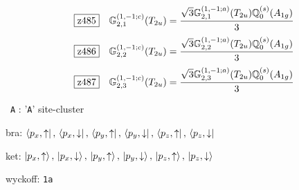 \documentclass[fleqn,10pt,landscape]{jsarticle}
\begin{document}
\begin{dmath*}
\hspace*{3mm}\fbox{z485}\quad \mathbb{G}_{2,1}^{(1,-1;c)}(T_{2u})=\frac{\sqrt{3} \mathbb{G}_{2,1}^{(1,-1;a)}(T_{2u}) \mathbb{Q}_{0}^{(s)}(A_{1g})}{3}
\end{dmath*}
\begin{dmath*}
\hspace*{3mm}\fbox{z486}\quad \mathbb{G}_{2,2}^{(1,-1;c)}(T_{2u})=\frac{\sqrt{3} \mathbb{G}_{2,2}^{(1,-1;a)}(T_{2u}) \mathbb{Q}_{0}^{(s)}(A_{1g})}{3}
\end{dmath*}
\begin{dmath*}
\hspace*{3mm}\fbox{z487}\quad \mathbb{G}_{2,3}^{(1,-1;c)}(T_{2u})=\frac{\sqrt{3} \mathbb{G}_{2,3}^{(1,-1;a)}(T_{2u}) \mathbb{Q}_{0}^{(s)}(A_{1g})}{3}
\end{dmath*}
\vspace{5mm}

\noindent\textbullet\, \texttt{A} : '\texttt{A}' site-cluster

\noindent\quad * bra: $\bra{p_{x},\uparrow},\, \bra{p_{x},\downarrow},\, \bra{p_{y},\uparrow},\, \bra{p_{y},\downarrow},\, \bra{p_{z},\uparrow},\, \bra{p_{z},\downarrow}$

\noindent\quad * ket: $\ket{p_{x},\uparrow},\, \ket{p_{x},\downarrow},\, \ket{p_{y},\uparrow},\, \ket{p_{y},\downarrow},\, \ket{p_{z},\uparrow},\, \ket{p_{z},\downarrow}$

\noindent\quad * wyckoff: \texttt{1a}
\end{document}
